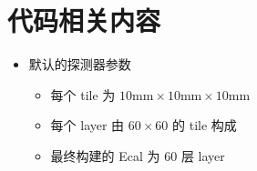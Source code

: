 \documentclass[11pt]{article}
\begin{document}
\section{代码相关内容}
\label{sec:org183175e}

\begin{itemize}
\item 默认的探测器参数
\begin{itemize}
\item 每个 tile 为 \(10\textrm{mm} \times 10\textrm{mm} \times 10\textrm{mm}\)
\item 每个 layer 由 \(60\times60\) 的 tile 构成
\item 最终构建的 Ecal 为 60 层 layer
\end{itemize}
\end{itemize}
\end{document}
